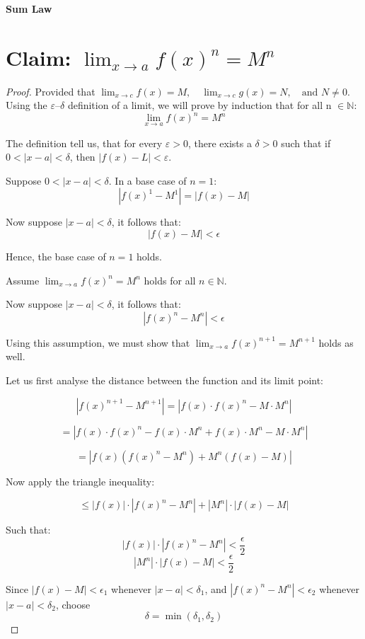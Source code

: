 \documentclass{article}
\begin{document}
	
	\textbf{Sum Law}
	
	\section*{Claim: $\lim_{x \to a} f(x)^n = M^n$}
	
	
	\begin{proof}
		
		Provided that $\lim_{x \to c} f(x) = M, \quad \lim_{x \to c} g(x) = N, \quad \text{and } N \neq 0.$ Using the $\varepsilon$–$\delta$ definition of a limit, we will prove by induction that for all n $\in \mathbb{N}$:
		\[
		\lim_{x \to a} f(x)^n = M^n
		\]
		
		The definition tell us, that for every $\varepsilon > 0$, there exists a $\delta > 0$ such that if $0 < |x - a| < \delta$, then $|f(x) - L| < \varepsilon$.
		
		
		Suppose $0 < |x - a| < \delta$. In a base case of $n = 1$:
		\[
		|f(x)^1 - M^1| = |f(x) - M|
		\]
		
		Now suppose $|x - a| < \delta$, it follows that:
		\[
		|f(x) - M| < \epsilon
		\]
		
		Hence, the base case of $n = 1$ holds.
		
		\vspace{1cm}
		
		Assume $\lim_{x \to a} f(x)^n = M^n$ holds for all $n \in \mathbb{N}$.
		
		Now suppose $|x - a| < \delta$, it follows that:
		\[
		|f(x)^n - M^n| < \epsilon
		\]
		
		Using this assumption, we must show that \( \lim_{x \to a} f(x)^{n+1} = M^{n+1} \) holds as well.
		
		Let us first analyse the distance between the function and its limit point:
		
		\[
		|f(x)^{n+1} - M^{n+1}| 
		= |f(x) \cdot f(x)^n - M \cdot M^n|
		\]
		
		\[
		= |f(x) \cdot f(x)^n - f(x) \cdot M^n + f(x) \cdot M^n - M \cdot M^n|
		\]
		
		\[
		= |f(x)(f(x)^n - M^n) + M^n(f(x) - M)|
		\]
		
		Now apply the triangle inequality:
		
		\[
		\leq |f(x)| \cdot |f(x)^n - M^n| + |M^n| \cdot |f(x) - M|
		\]
		
		Such that:
		\[
		|f(x)| \cdot |f(x)^n - M^n| < \frac{\epsilon}{2}
		\]
		\[
		|M^n| \cdot |f(x) - M| < \frac{\epsilon}{2}
		\]
		
		Since \( |f(x) - M| < \epsilon_1 \) whenever \( |x - a| < \delta_1 \), and
		\( |f(x)^n - M^n| < \epsilon_2 \) whenever \( |x - a| < \delta_2 \),  
		choose
		\[
		\delta = \min(\delta_1, \delta_2)
		\]
		

\end{proof}
\end{document}
